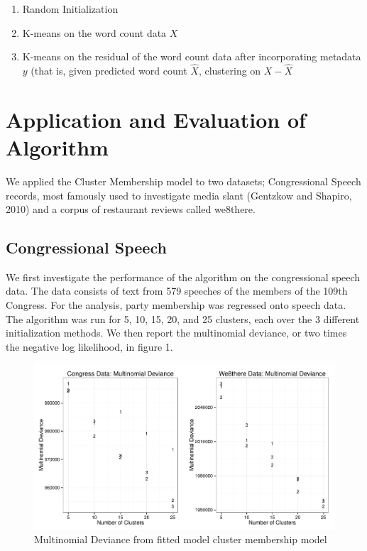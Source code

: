 \documentclass[12pt]{article}
\begin{document}
\begin{enumerate}
\def\labelenumi{\arabic{enumi}.}
\itemsep1pt\parskip0pt
\item
  Random Initialization
\item
  K-means on the word count data $X$
\item
  K-means on the residual of the word count data after incorporating
  metadata $y$ (that is, given predicted word count $\hat{X}$,
  clustering on $X-\hat{X}$
\end{enumerate}


\section{Application and Evaluation of Algorithm}\label{application}

We applied the Cluster Membership model to two datasets; Congressional Speech records, most famously used to investigate media slant (Gentzkow and Shapiro, 2010) and a corpus of restaurant reviews called we8there.

\subsection{Congressional Speech} 

We first investigate the performance of the algorithm on the congressional speech data. The data consists of text from 579 speeches of the members of the 109th Congress. For the analysis, party membership was regressed onto speech data. The algorithm was run for 5, 10, 15, 20, and 25 clusters, each over the 3 different initialization methods. We then report the multinomial deviance, or two times the negative log likelihood, in figure 1. 

\begin{figure}[!htpb]
  \centering
  \includegraphics[width=6.2in]{Images/mdev_both.pdf}
  \caption[Multinomial Deviance: Congress Data]
   {Multinomial Deviance from fitted model cluster membership model}
\end{figure}
\end{document}
